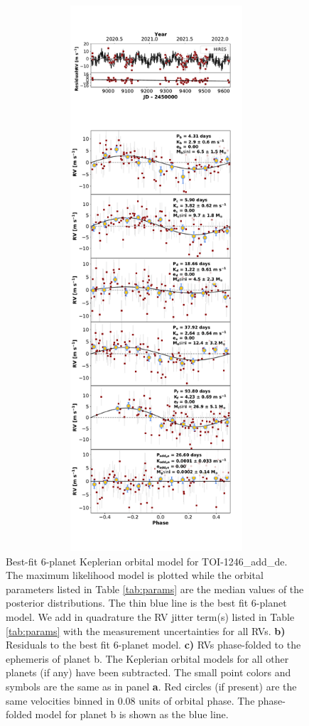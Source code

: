 \documentclass{emulateapj}
\begin{document}
\begin{figure}[!h]
\centering 

\includegraphics[height=8.0in,width=6.0in,keepaspectratio]{TOI-1246_add_de_rv_multipanel.pdf}
\caption{ Best-fit 6-planet Keplerian orbital model
  for TOI-1246\_add\_de. The maximum likelihood model is plotted while
  the orbital parameters listed in Table \ref{tab:params} are the
  median values of the posterior distributions.  The thin blue line is
  the best fit 6-planet model. We add in quadrature
  the RV jitter term(s) listed in Table \ref{tab:params} with the
  measurement uncertainties for all RVs.  {\bf b)} Residuals to the
  best fit 6-planet model. {\bf c)} RVs phase-folded
  to the ephemeris of planet b. The Keplerian orbital models for all
  other planets (if any) have been subtracted.  The small point colors
  and symbols are the same as in panel {\bf a}.  Red circles (if
  present) are the same velocities binned in 0.08 units of orbital
  phase.  The phase-folded model for planet b is shown as the blue
  line.}
\end{figure}
 
\end{document}
